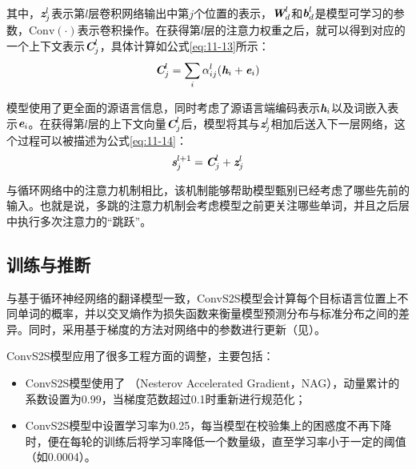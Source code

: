 \noindent 其中，$\textbf{\em z}_j^l$表示第$l$层卷积网络输出中第$j$个位置的表示，$\textbf{\em W}_{d}^{l}$和$\textbf{\em b}_{d}^{l}$是模型可学习的参数，$\textrm{Conv}(\cdot)$表示卷积操作。在获得第$l$层的注意力权重之后，就可以得到对应的一个上下文表示$\textbf{\em C}_j^l$，具体计算如公式\eqref{eq:11-13}所示：
\begin{eqnarray}
\textbf{\em C}_j^l = \sum_i \alpha_{ij}^l (\textbf{\em h}_i + \textbf{\em e}_i)
\label{eq:11-13}
\end{eqnarray}

\noindent 模型使用了更全面的源语言信息，同时考虑了源语言端编码表示$\textbf{\em h}_i$以及词嵌入表示$\textbf{\em e}_i$。在获得第$l$层的上下文向量$\textbf{\em C}_j^l$后，模型将其与$\textbf{\em z}_j^l$相加后送入下一层网络，这个过程可以被描述为公式\eqref{eq:11-14}：
\begin{eqnarray}
\textbf{\em s}_j^{l+1} = \textbf{\em C}_j^l + \textbf{\em z}_j^l
\label{eq:11-14}
\end{eqnarray}

\noindent 与循环网络中的注意力机制相比，该机制能够帮助模型甄别已经考虑了哪些先前的输入。也就是说，多跳的注意力机制会考虑模型之前更关注哪些单词，并且之后层中执行多次注意力的“跳跃”。


\subsection{训练与推断}

\parinterval 与基于循环神经网络的翻译模型一致，ConvS2S模型会计算每个目标语言位置上不同单词的概率，并以交叉熵作为损失函数来衡量模型预测分布与标准分布之间的差异。同时，采用基于梯度的方法对网络中的参数进行更新（见{\chapternine}）。

\parinterval ConvS2S模型应用了很多工程方面的调整，主要包括：
\begin{itemize}
\vspace{0.5em}
\item ConvS2S模型使用了{\small{}} （Nesterov Accelerated Gradient，NAG），动量累计的系数设置为0.99，当梯度范数超过0.1时重新进行规范化；

\vspace{0.5em}
\item ConvS2S模型中设置学习率为0.25，每当模型在校验集上的困惑度不再下降时，便在每轮的训练后将学习率降低一个数量级，直至学习率小于一定的阈值（如0.0004）。
\vspace{0.5em}

\end{itemize}

